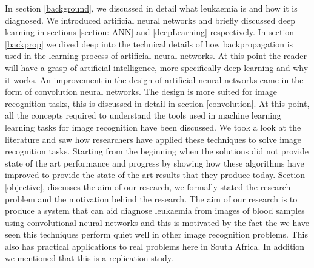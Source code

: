 \documentclass[a4paper,11pt]{article}
\begin{document}
In section \ref{background},  we discussed in detail what leukaemia is and how it is diagnosed. We  introduced artificial neural networks and briefly discussed deep learning in sections \ref{section: ANN} and \ref{deepLearning} respectively. In section \ref{backprop} we dived deep into the technical details of how backpropagation is used in the learning process of artificial neural networks. At this point the reader will have a grasp of artificial intelligence, more specifically deep learning and why it works. An improvement in the design of artificial neural networks came in the form of convolution neural networks. The design is more suited for image recognition tasks, this is discussed in detail in section \ref{convolution}. At this point, all the concepts required to understand the tools used in machine learning learning tasks for image recognition have been discussed. We took a look at the literature and saw how researchers have applied these techniques to solve image recognition tasks. Starting from the beginning when the solutions did not provide state of the art performance and progress by showing how these algorithms have improved to provide the state of the art results that they produce today. Section \ref{objective}, discusses the aim of our research, we formally stated the research problem and the motivation behind the research. The aim of our research is to produce a system that can aid diagnose leukaemia from images of blood samples using convolutional neural networks and this is motivated by the fact the we have seen this techniques perform quiet well in other image recognition problems. This also has practical applications to real problems here in South Africa. In addition we mentioned that this is a replication study.

\newpage
\medskip



\end{document}
